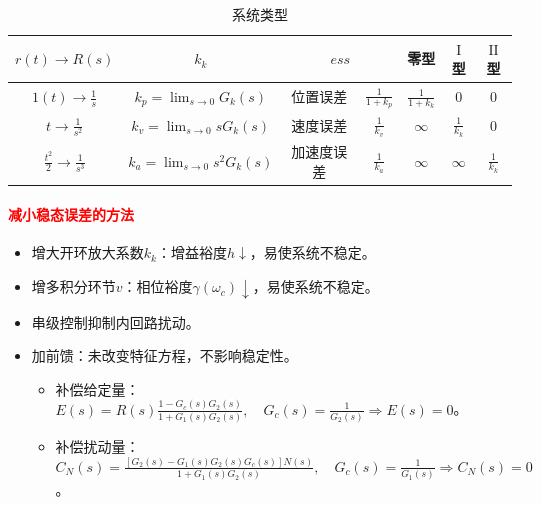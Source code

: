 \documentclass[
12pt, %
a4paper, 
oneside, %
]{scrartcl}
\begin{document}
\begin{table}[H]
\centering
\begin{tabular}{|c|c|c|c|c|c|c|}
\hline
$ r(t) \to R(s) $ & $ k_k $ & \multicolumn{2}{c|}{$ ess $} & 零型 & $ \mathrm{I} $型 & $ \mathrm{II} $型 \\
\hline
$ 1(t) \to \frac{1}{s} $ & $ k_p = \lim_{s \to 0} G_k(s) $ & 位置误差 & $ \frac{1}{1 + k_p} $ & $ \frac{1}{1 + k_k} $ & $ 0 $ & $ 0 $ \\
\hline
$ t \to \frac{1}{s^2} $ & $ k_v = \lim_{s \to 0} s G_k(s) $ & 速度误差 & $ \frac{1}{k_v} $ & $ \infty $ & $ \frac{1}{k_k} $ & $ 0 $ \\
\hline
$ \frac{t^2}{2} \to \frac{1}{s^3} $ & $ k_a = \lim_{s \to 0} s^2 G_k(s) $ & 加速度误差 & $ \frac{1}{k_a} $ & $ \infty $ & $ \infty $ & $ \frac{1}{k_k} $ \\
\hline
\end{tabular}
\caption{系统类型}
\end{table}
\paragraph{\textcolor{red}{减小稳态误差的方法}}
\begin{itemize}
\item 增大开环放大系数$ k_k $：增益裕度$ h \downarrow $，易使系统不稳定。
\item 增多积分环节$ v $：相位裕度$ \gamma(\omega_c) \downarrow $，易使系统不稳定。
\item 串级控制抑制内回路扰动。
\item 加前馈：未改变特征方程，不影响稳定性。
\begin{itemize}
\item 补偿给定量：$ E(s) = R(s)\frac{1 - G_c(s)G_2(s)}{1 + G_1(s)G_2(s)}, \quad G_c(s) = \frac{1}{G_2(s)} \Rightarrow E(s) = 0 $。
\item 补偿扰动量：$ C_N(s) = \frac{[G_2(s) - G_1(s)G_2(s)G_c(s)]N(s)}{1 + G_1(s)G_2(s)}, \quad G_c(s) = \frac{1}{G_1(s)} \Rightarrow C_N(s) = 0 $。
\end{itemize}
\end{itemize}
\end{document}

